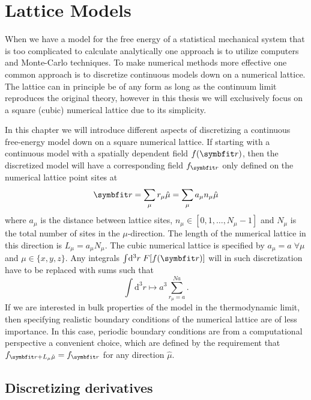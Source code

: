 \chapter{Lattice Models}

When we have a model for the free energy of a statistical mechanical system that is too complicated to
calculate analytically one approach is to utilize computers and Monte-Carlo techniques. To make numerical
methods more effective one common approach is to discretize continuous models down on a 
numerical lattice. The lattice can in principle be of any form as long as the continuum limit reproduces
the original theory, however in this thesis we will exclusively focus on a square (cubic) numerical lattice
due to its simplicity.

In this chapter we will introduce different aspects of discretizing a continuous free-energy model down
on a square numerical lattice. If starting with a continuous model with a spatially dependent field
$f(\v{r})$, then the discretized model will have a corresponding field $f_\v{r}$ only defined on the
numerical lattice point sites at
\begin{equation}
    \label{eq:LM:latticeSites}
    \v{r} = \sum_\mu r_\mu\hat{\mu} = \sum_\mu a_\mu n_\mu\hat{\mu}
\end{equation}
where $a_\mu$ is the distance between lattice sites, $n_\mu\in[0,1,\ldots,N_\mu-1]$ and $N_\mu$ is the total number of sites in the $\mu$-direction.
The length of the numerical lattice in this direction is $L_\mu = a_\mu N_\mu$. The cubic numerical lattice
is specified by $a_\mu = a\;\forall\mu$ and $\mu\in\{x,y,z\}$.
Any integrals $\int\!\mathrm{d}^3r\;F[f(\v{r})]$ will
in such discretization have to be replaced with sums such that
\begin{equation}
    \label{eq:LM:integrals}
    \int\!\mathrm{d}^3r \mapsto a^3\sum_{r_\mu=a}^{Na}.
\end{equation}
If we are interested in bulk properties of the model in the thermodynamic limit, then specifying realistic
boundary conditions of the numerical lattice are of less importance. In this case, periodic boundary conditions
are from a computational perspective a convenient choice, which are defined by the requirement that
$f_{\v{r}+L_\mu\hat{\mu}} = f_\v{r}$ for any direction $\hat{\mu}$.

\section{Discretizing derivatives}

